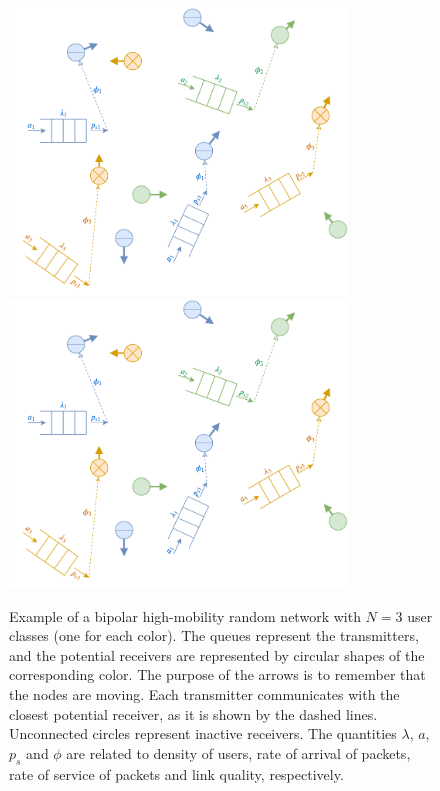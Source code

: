 \begin{figure}[H]
    \centering
    \if{}
        \includegraphics[width=0.8\textwidth]{Figures/Ch7_BipolarQueuedNetwork.pdf}
    \else
        \includegraphics[draft,width=0.8\textwidth]{Figures/Ch7_BipolarQueuedNetwork.pdf}
    \fi
    \caption{Example of a bipolar high-mobility random network with $N=3$ user classes (one for each color). The queues represent the transmitters, and the potential receivers are represented by circular shapes of the corresponding color. The purpose of the arrows is to remember that the nodes are moving. Each transmitter communicates with the closest potential receiver, as it is shown by the dashed lines. Unconnected circles represent inactive receivers. The quantities $\lambda$, $a$, $p_s$ and $\phi$ are related to density of users, rate of arrival of packets, rate of service of packets and link quality, respectively.}
    \label{fig:BipolarNetwork}
\end{figure}

